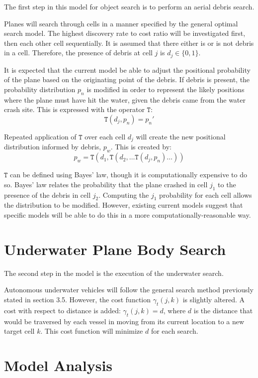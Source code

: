 \documentclass[a4paper]{article}
\begin{document}
The first step in this model for object search is to perform an aerial debris search. 

Planes will search through cells in a manner specified by the general optimal search model. The highest discovery rate to cost ratio will be investigated first, then each other cell sequentially. It is assumed that there either is or is not debris in a cell. Therefore, the presence of debris at cell $j$ is $d_j\in \{0,1\}$.  

It is expected that the current model be able to adjust the positional probability of the plane based on the originating point of the debris. If debris is present, the probability distribution $p_n$ is modified in order to represent the likely positions where the plane must have hit the water, given the debris came from the water crash site. This is expressed with the operator $\mathtt{T}$: $$\mathtt{T}(d_j,p_n)=p_n'$$

Repeated application of $\mathtt{T}$ over each cell $d_j$ will create the new positional distribution informed by debris, $p_w$. This is created by: $$p_w=\mathtt{T}(d_1, \mathtt{T}(d_2, \ldots \mathtt{T}(d_j, p_n)\ldots))$$

$\mathtt{T}$ can be defined using Bayes' law, though it is computationally expensive to do so. Bayes' law relates the probability that the plane crashed in cell $j_1$ to the presence of the debris in cell $j_2$. Computing the $j_1$ probability for each cell allows the distribution to be modified. However, existing current models suggest that specific models will be able to do this in a more computationally-reasonable way.

\section{Underwater Plane Body Search}

The second step in the model is the execution of the underwater search. 

Autonomous underwater vehicles will follow the general search method previously stated in section 3.5. However, the cost function $\gamma_t(j,k)$ is slightly altered. A cost with respect to distance is added: $\gamma_t(j,k)=d$, where $d$ is the distance that would be traversed by each vessel in moving from its current location to a new target cell $k$. This cost function will minimize $d$ for each search. 

\section{Model Analysis}
\end{document}
